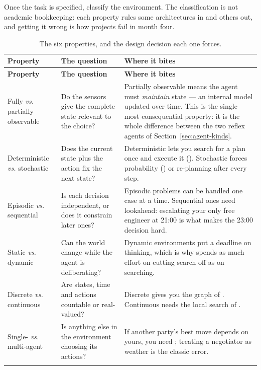 Once the task is specified, classify the environment. The classification is not
academic bookkeeping: each property rules some architectures in and others out, and
getting it wrong is how projects fail in month four.

\smallskip
\noindent\begin{longtable}{@{}L{3.3cm}L{5.5cm}L{6.2cm}@{}}
\toprule
\textbf{Property} & \textbf{The question} & \textbf{Where it bites} \\
\midrule
\endfirsthead
\toprule
\textbf{Property} & \textbf{The question} & \textbf{Where it bites} \\
\midrule
\endhead
Fully \emph{vs.} partially observable &
Do the sensors give the complete state relevant to the choice? &
Partially observable means the agent must \emph{maintain} state --- an internal
model updated over time. This is the single most consequential property: it is the
whole difference between the two reflex agents of
Section~\ref{sec:agent-kinds}. \\
Deterministic \emph{vs.} stochastic &
Does the current state plus the action fix the next state? &
Deterministic lets you search for a plan once and execute it
(). Stochastic forces probability () or
re-planning after every step. \\
Episodic \emph{vs.} sequential &
Is each decision independent, or does it constrain later ones? &
Episodic problems can be handled one case at a time. Sequential ones need
lookahead: escalating your only free engineer at 21:00 is what makes the 23:00
decision hard. \\
Static \emph{vs.} dynamic &
Can the world change while the agent is deliberating? &
Dynamic environments put a deadline on thinking, which is why
 spends as much effort on cutting search off as on searching. \\
Discrete \emph{vs.} continuous &
Are states, time and actions countable or real-valued? &
Discrete gives you the graph of . Continuous needs the local
search of . \\
Single- \emph{vs.} multi-agent &
Is anything else in the environment choosing its actions? &
If another party's best move depends on yours, you need
; treating a negotiator as weather is the classic error. \\
\bottomrule
\caption{The six properties, and the design decision each one forces.}
\label{tab:envprops}
\end{longtable}


